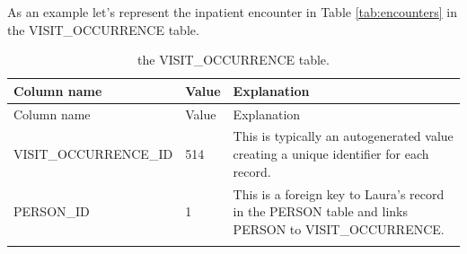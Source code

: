 \documentclass[11pt]{book}
\theoremstyle{definition}
\theoremstyle{definition}
\theoremstyle{definition}
\theoremstyle{remark}
\begin{document}
As an example let's represent the inpatient encounter in Table \ref{tab:encounters} in the VISIT\_OCCURRENCE table.

\begin{longtable}[]{@{}lll@{}}
\caption{\label{tab:visitOccurrence} the VISIT\_OCCURRENCE table.}\tabularnewline
\toprule
\begin{minipage}[b]{0.28\columnwidth}\raggedright
Column name\strut
\end{minipage} & \begin{minipage}[b]{0.15\columnwidth}\raggedright
Value\strut
\end{minipage} & \begin{minipage}[b]{0.49\columnwidth}\raggedright
Explanation\strut
\end{minipage}\tabularnewline
\midrule
\endfirsthead
\toprule
\begin{minipage}[b]{0.28\columnwidth}\raggedright
Column name\strut
\end{minipage} & \begin{minipage}[b]{0.15\columnwidth}\raggedright
Value\strut
\end{minipage} & \begin{minipage}[b]{0.49\columnwidth}\raggedright
Explanation\strut
\end{minipage}\tabularnewline
\midrule
\endhead
\begin{minipage}[t]{0.28\columnwidth}\raggedright
VISIT\_OCCURRENCE\_ID\strut
\end{minipage} & \begin{minipage}[t]{0.15\columnwidth}\raggedright
514\strut
\end{minipage} & \begin{minipage}[t]{0.49\columnwidth}\raggedright
This is typically an autogenerated value creating a unique identifier for each record.\strut
\end{minipage}\tabularnewline
\begin{minipage}[t]{0.28\columnwidth}\raggedright
PERSON\_ID\strut
\end{minipage} & \begin{minipage}[t]{0.15\columnwidth}\raggedright
1\strut
\end{minipage} & \begin{minipage}[t]{0.49\columnwidth}\raggedright
This is a foreign key to Laura's record in the PERSON table and links PERSON to VISIT\_OCCURRENCE.\strut
\end{minipage}\tabularnewline
\begin{minipage}[t]{0.28\columnwidth}\raggedright

\end{minipage}
\end{longtable}
\end{document}
